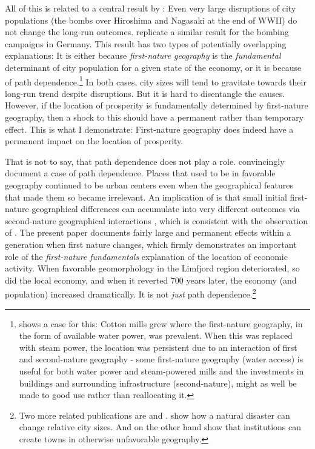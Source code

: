 \documentclass[11pt]{article}
\begin{document}
All of this is related to a central result by \cite{Davis2002}: Even very large disruptions of city populations (the bombs over Hiroshima and Nagasaki at the end of WWII) do not change the long-run outcomes. \cite{Brakman2004Bombs} replicate a similar result for the bombing campaigns in Germany. This result has two types of potentially overlapping explanations: It is either because \textit{first-nature geography} is the \textit{fundamental} determinant of city population for a given state of the economy, or it is because of path dependence.\footnote{\cite{CraftsWolf2014} shows a case for this: Cotton mills grew where the first-nature geography, in the form of available water power, was prevalent. When this was replaced with steam power, the location was persistent due to an interaction of first and second-nature geography - some first-nature geography (water access) is useful for both water power and steam-powered mills and the investments in buildings and surrounding infrastructure (second-nature), might as well be made to good use rather than reallocating it.} In both cases, city sizes will tend to gravitate towards their long-run trend despite disruptions. But it is hard to disentangle the causes. However, if the location of prosperity is fundamentally determined by first-nature geography, then a shock to this should have a permanent rather than temporary effect. This is what I demonstrate: First-nature geography does indeed have a permanent impact on the location of prosperity. 

That is not to say, that path dependence does not play a role. \cite{Bleakley2012} convincingly document a case of path dependence. Places that used to be in favorable geography continued to be urban centers even when the geographical features that made them so became irrelevant. An implication of \cite{Krugman1991} is that small initial first-nature geographical differences can accumulate into very different outcomes via second-nature geographical interactions \citep{Caruana-Galizia_Okubo_Wolf_2021}, which is consistent with the observation of \cite{Bleakley2012}. The present paper documents fairly large and permanent effects within a generation when first nature changes, which firmly demonstrates an important role of the \textit{first-nature fundamentals} explanation of the location of economic activity. When favorable geomorphology in the Limfjord region deteriorated, so did the local economy, and when it reverted 700 years later, the economy (and population) increased dramatically. It is not \textit{just} path dependence.\footnote{Two more related publications are \cite{Ager2020a} and \cite{Cermeno2019}. \cite{Ager2020a} show how a natural disaster can change relative city sizes. And on the other hand \cite{Cermeno2019} show that institutions can create towns in otherwise unfavorable geography.}
\end{document}
